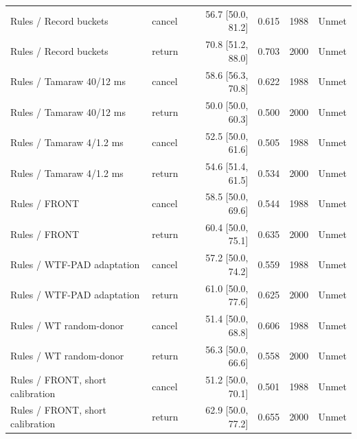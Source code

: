 \begin{longtable}{@{}llrrrr@{}}
Rules / Record buckets & cancel & 56.7 [50.0, 81.2] & 0.615 & 1988 & Unmet\\
Rules / Record buckets & return & 70.8 [51.2, 88.0] & 0.703 & 2000 & Unmet\\
Rules / Tamaraw 40/12 ms & cancel & 58.6 [56.3, 70.8] & 0.622 & 1988 & Unmet\\
Rules / Tamaraw 40/12 ms & return & 50.0 [50.0, 60.3] & 0.500 & 2000 & Unmet\\
Rules / Tamaraw 4/1.2 ms & cancel & 52.5 [50.0, 61.6] & 0.505 & 1988 & Unmet\\
Rules / Tamaraw 4/1.2 ms & return & 54.6 [51.4, 61.5] & 0.534 & 2000 & Unmet\\
Rules / FRONT & cancel & 58.5 [50.0, 69.6] & 0.544 & 1988 & Unmet\\
Rules / FRONT & return & 60.4 [50.0, 75.1] & 0.635 & 2000 & Unmet\\
Rules / WTF-PAD adaptation & cancel & 57.2 [50.0, 74.2] & 0.559 & 1988 & Unmet\\
Rules / WTF-PAD adaptation & return & 61.0 [50.0, 77.6] & 0.625 & 2000 & Unmet\\
Rules / WT random-donor & cancel & 51.4 [50.0, 68.8] & 0.606 & 1988 & Unmet\\
Rules / WT random-donor & return & 56.3 [50.0, 66.6] & 0.558 & 2000 & Unmet\\
Rules / FRONT, short calibration & cancel & 51.2 [50.0, 70.1] & 0.501 & 1988 & Unmet\\
Rules / FRONT, short calibration & return & 62.9 [50.0, 77.2] & 0.655 & 2000 & Unmet\\
\bottomrule\end{longtable}
